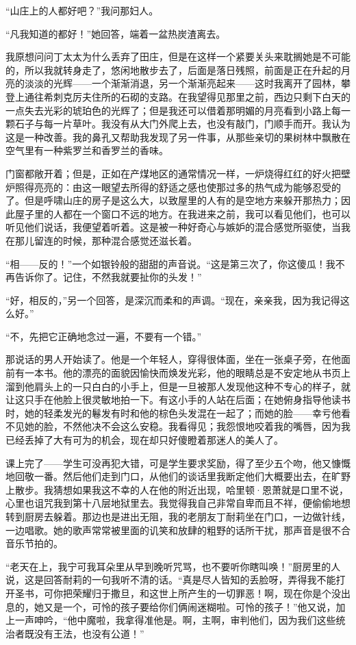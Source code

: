 \par “山庄上的人都好吧？”我问那妇人。
\par “凡我知道的都好！”她回答，端着一盆热炭渣离去。
\par 我原想问问丁太太为什么丢弃了田庄，但是在这样一个紧要关头来耽搁她是不可能的，所以我就转身走了，悠闲地散步去了，后面是落日残照，前面是正在升起的月亮的淡淡的光辉——一个渐渐消退，另一个渐渐亮起来——这时我离开了园林，攀登上通往希刺克厉夫住所的石砌的支路。在我望得见那里之前，西边只剩下白天的一点失去光彩的琥珀色的光辉了；但是我还可以借着那明媚的月亮看到小路上每一颗石子与每一片草叶。我没有从大门外爬上去，也没有敲门，门顺手而开。我认为这是一种改善。我的鼻孔又帮助我发现了另一件事，从那些亲切的果树林中飘散在空气里有一种紫罗兰和香罗兰的香味。
\par 门窗都敞开着；但是，正如在产煤地区的通常情况一样，一炉烧得红红的好火把壁炉照得亮亮的：由这一眼望去所得的舒适之感也使那过多的热气成为能够忍受的了。但是呼啸山庄的房子是这么大，以致屋里的人有的是空地方来躲开那热力；因此屋子里的人都在一个窗口不远的地方。在我进来之前，我可以看见他们，也可以听见他们说话，我便望着听着。这是被一种好奇心与嫉妒的混合感觉所驱使，当我在那儿留连的时候，那种混合感觉还滋长着。
\par “相——反的！”一个如银铃般的甜甜的声音说。“这是第三次了，你这傻瓜！我不再告诉你了。记住，不然我就要扯你的头发！”
\par “好，相反的，”另一个回答，是深沉而柔和的声调。“现在，亲亲我，因为我记得这么好。”
\par “不，先把它正确地念过一遍，不要有一个错。”
\par 那说话的男人开始读了。他是一个年轻人，穿得很体面，坐在一张桌子旁，在他面前有一本书。他的漂亮的面貌因愉快而焕发光彩，他的眼睛总是不安定地从书页上溜到他肩头上的一只白白的小手上，但是一旦被那人发现他这种不专心的样子，就让这只手在他脸上很灵敏地拍一下。有这小手的人站在后面；在她俯身指导他读书时，她的轻柔发光的鬈发有时和他的棕色头发混在一起了；而她的脸——幸亏他看不见她的脸，不然他决不会这么安稳。我看得见；我怨恨地咬着我的嘴唇，因为我已经丢掉了大有可为的机会，现在却只好傻瞪着那迷人的美人了。
\par 课上完了——学生可没再犯大错，可是学生要求奖励，得了至少五个吻，他又慷慨地回敬一番。然后他们走到门口，从他们的谈话里我断定他们大概要出去，在旷野上散步。我猜想如果我这不幸的人在他的附近出现，哈里顿·恩萧就是口里不说，心里也诅咒我到第十八层地狱里去。我觉得我自己非常自卑而且不祥，便偷偷地想转到厨房去躲着。那边也是进出无阻，我的老朋友丁耐莉坐在门口，一边做针线，一边唱歌。她的歌声常常被里面的讥笑和放肆的粗野的话所干扰，那声音是很不合音乐节拍的。
\par “老天在上，我宁可我耳朵里从早到晚听咒骂，也不要听你瞎叫唤！”厨房里的人说，这是回答耐莉的一句我听不清的话。“真是尽人皆知的丢脸呀，弄得我不能打开圣书，可你把荣耀归于撒旦，和这世上所产生的一切罪恶！啊，现在你是个没出息的，她又是一个，可怜的孩子要给你们俩闹迷糊啦。可怜的孩子！”他又说，加上一声呻吟，“他中魔啦，我拿得准他是。啊，主啊，审判他们，因为我们这些统治者既没有王法，也没有公道！”
